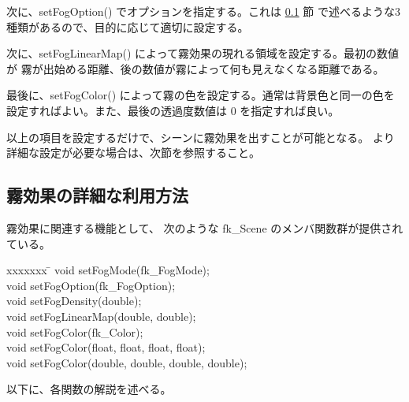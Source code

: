 次に、setFogOption() でオプションを指定する。これは \ref{subsec:scenefogref} 節
で述べるような3種類があるので、目的に応じて適切に設定する。

次に、setFogLinearMap() によって霧効果の現れる領域を設定する。最初の数値が
霧が出始める距離、後の数値が霧によって何も見えなくなる距離である。

最後に、setFogColor() によって霧の色を設定する。通常は背景色と同一の色を
設定すればよい。また、最後の透過度数値は 0 を指定すれば良い。

以上の項目を設定するだけで、シーンに霧効果を出すことが可能となる。
より詳細な設定が必要な場合は、次節を参照すること。
\subsection{霧効果の詳細な利用方法} \label{subsec:scenefogref}
霧効果に関連する機能として、
次のような fk\_Scene のメンバ関数群が提供されている。
\begin{bf}
\begin{tabbing}
xxxxxxx \= \kill
\> void setFogMode(fk\_FogMode); \\
\> void setFogOption(fk\_FogOption); \\
\> void setFogDensity(double); \\
\> void setFogLinearMap(double, double); \\
\> void setFogColor(fk\_Color); \\
\> void setFogColor(float, float, float, float); \\
\> void setFogColor(double, double, double, double); \\
\end{tabbing}
\end{bf}
以下に、各関数の解説を述べる。
